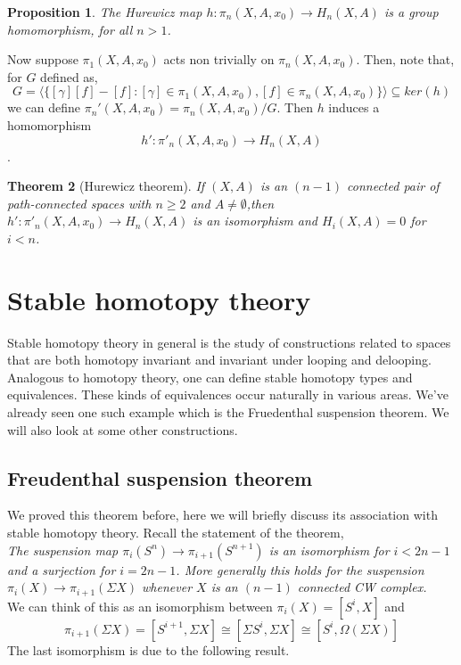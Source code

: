 \documentclass[12pt]{extarticle}
\numberwithin{equation}{section}
\newtheorem{thm}{Theorem}[section]
\newtheorem{prp}[thm]{Proposition}
\begin{document}
\begin{prp}
The Hurewicz map $h:\pi_n(X,A,x_0)\to H_n(X,A)$ is a group homomorphism, for all $n>1$.
\end{prp}

Now suppose $\pi_1(X,A,x_0)$ acts non trivially on $\pi_n(X,A,x_0)$. Then, note that, for $G$ defined as, \[G=\langle\{[\gamma][f]-[f]:[\gamma]\in \pi_1(X,A,x_0), [f]\in \pi_n(X,A,x_0)\}\rangle \subseteq ker(h)\] we can define $\pi_n'(X,A,x_0) = \pi_n(X,A,x_0)/G$. Then $h$ induces a homomorphism $$h':\pi'_n(X,A,x_0)\to H_n(X,A)$$.

\begin{thm}[Hurewicz theorem]\cite[p.~371]{Hatcher}
If $(X,A)$ is an $(n - 1)$ connected pair of path-connected spaces
with $n \geq 2$ and $A\neq \emptyset$,then $h' :\pi'
_n(X,A,x_0)\to H_n(X,A)$ is an isomorphism and
$H_i(X,A) = 0$ for $i < n$.
\end{thm}
\section{Stable homotopy theory}
Stable homotopy theory in general is the study of constructions related to spaces that are both homotopy invariant and invariant under looping and delooping. Analogous to homotopy theory, one can define stable homotopy types and equivalences. These kinds of equivalences occur naturally in various areas. We've already seen one such example which is the Fruedenthal suspension theorem. We will also look at some other constructions.

\subsection{Freudenthal suspension theorem}
We proved this theorem before, here we will briefly discuss its association with stable homotopy theory. Recall the statement of the theorem,\\

\emph{The suspension map $\pi_i(S^n)\to\pi_{i+1}(S^{n+1})$ is an isomorphism for
$i<2n - 1$ and a surjection for $i = 2n - 1$. More generally this holds for the
suspension $\pi_i(X)\to \pi_{i+1}(\Sigma X)$ whenever $X$ is an $(n-1)$ connected CW complex.}\\

We can think of this as an isomorphism between $\pi_i(X)=[S^i,X]$ and $$\pi_{i+1}(\Sigma X)=[S^{i+1},\Sigma X]\cong [\Sigma S^i, \Sigma X] \cong [S^i, \Omega(\Sigma X)]$$
The last isomorphism is due to the following result.\\
\end{document}
